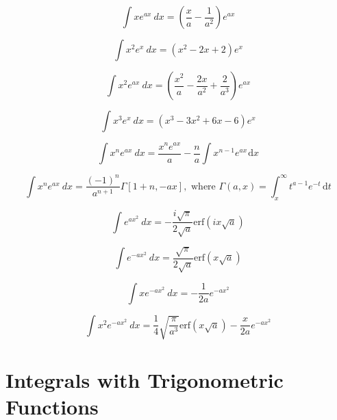 \documentclass[12pt,letterpaper,leqno]{article}
\begin{document}
\begin{equation}
\int x e^{ax}\ dx = \left(\frac{x}{a}-\frac{1}{a^2}\right) e^{ax} 
\end{equation}

\begin{equation}
\int x^2 e^{x}\ dx = \left(x^2 - 2x + 2\right) e^{x}
\end{equation}

\begin{equation}
\int x^2 e^{ax}\ dx = \left(\frac{x^2}{a}-\frac{2x}{a^2}+\frac{2}{a^3}\right) e^{ax} 
\end{equation}

\begin{equation}
\int x^3 e^{x}\ dx = \left(x^3-3x^2 + 6x - 6\right) e^{x} 
\end{equation}
 
\begin{equation}\label{eq:swift1}
\int x^n e^{ax}\ dx = \dfrac{x^n e^{ax}}{a} - 
\dfrac{n}{a}\int x^{n-1}e^{ax}\hspace{1pt}\text{d}x
\end{equation} 
 
\begin{equation}\label{eq:ebke}
\int x^n e^{ax}\ dx = \frac{(-1)^n}{a^{n+1}}\Gamma[1+n,-ax], 
 \text{ where } \Gamma(a,x)=\int_x^{\infty} t^{a-1}e^{-t}\hspace{2pt}\text{d}t
 \end{equation}

\begin{equation}\label{eq:swift2}
\int e^{ax^2}\ dx = -\frac{i\sqrt{\pi}}{2\sqrt{a}}\text{erf}\left(ix\sqrt{a}\right) 
\end{equation}

\begin{equation}\label{eq:swift3}
\int e^{-ax^2}\ dx = \frac{\sqrt{\pi}}{2\sqrt{a}}\text{erf}\left(x\sqrt{a}\right) 
\end{equation}

\begin{equation}\label{eq:qarles1}
\int x e^{-ax^2}\ {dx} = -\dfrac{1}{2a}e^{-ax^2} 
\end{equation}

\begin{equation}\label{eq:qarles2}
\int x^2 e^{-ax^2}\ {dx} = \dfrac{1}{4}\sqrt{\dfrac{\pi}{a^3}}\text{erf}(x\sqrt{a}) -\dfrac{x}{2a}e^{-ax^2}
\end{equation}


\section* {Integrals with Trigonometric Functions}
\end{document}

